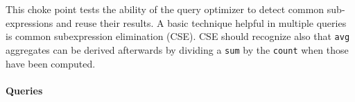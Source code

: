 
This choke point tests the ability of the query optimizer to detect common sub-expressions and reuse their results. A basic technique helpful in multiple queries is common subexpression elimination (CSE).
CSE should recognize also that \lstinline{avg} aggregates can be derived afterwards by dividing a \lstinline{sum} by the \lstinline{count} when those have been computed.


\paragraph{Queries}
{\raggedright

}